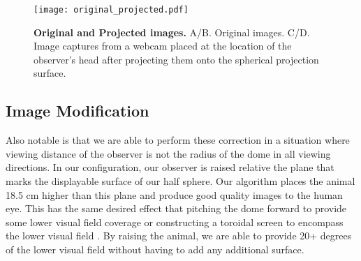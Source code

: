 \documentclass[10pt,letterpaper]{article}
\newlength\savedwidth
\newcommand\thickhline{\noalign{\global\savedwidth\arrayrulewidth\global\arrayrulewidth 2pt}%
\hline
\noalign{\global\arrayrulewidth\savedwidth}}
\begin{document}
\begin{figure}[h]
\centering
\texttt{[image: original\_projected.pdf]}
\caption{{\bf Original and Projected images.}
A/B. Original images. C/D. Image captures from a webcam placed at the location of the observer's head after projecting them onto the spherical projection surface.}
\label{fig:Compare}
\end{figure}

\subsection*{Image Modification}
Also notable is that we are able to perform these correction in a situation where viewing distance of the observer is not the radius of the dome in all viewing directions. 
In our configuration, our observer is raised relative the plane that marks the displayable surface of our half sphere. Our algorithm places the animal 18.5 cm higher than 
this plane and produce good quality images to the human eye. This has the same desired effect that pitching the dome forward to provide some lower visual field coverage 
\cite{schmidt2013cellular} or constructing a toroidal screen to encompass the lower visual field \cite{holscher2005rats, harvey2009intracellular}. By raising the animal, we 
are able to provide 20+ degrees of the lower visual field without having to add any additional surface. 

\end{document}
